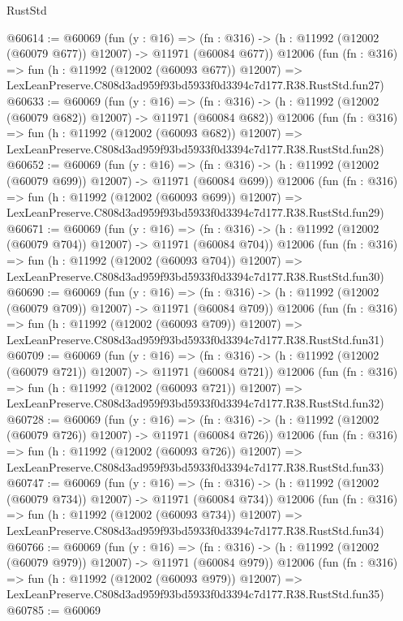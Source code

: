 \begin{lexlean}{RustStd}
\begin{coremodule}
@60614 := @60069
    (fun (y : @16) =>
    (fn : @316) -> (h : @11992 (@12002 (@60079 @677)) @12007) -> @11971 (@60084 @677))
    @12006
    (fun (fn : @316) =>
    fun (h : @11992 (@12002 (@60093 @677)) @12007) =>
    LexLeanPreserve.C808d3ad959f93bd5933f0d3394c7d177.R38.RustStd.fun27)
@60633 := @60069
    (fun (y : @16) =>
    (fn : @316) -> (h : @11992 (@12002 (@60079 @682)) @12007) -> @11971 (@60084 @682))
    @12006
    (fun (fn : @316) =>
    fun (h : @11992 (@12002 (@60093 @682)) @12007) =>
    LexLeanPreserve.C808d3ad959f93bd5933f0d3394c7d177.R38.RustStd.fun28)
@60652 := @60069
    (fun (y : @16) =>
    (fn : @316) -> (h : @11992 (@12002 (@60079 @699)) @12007) -> @11971 (@60084 @699))
    @12006
    (fun (fn : @316) =>
    fun (h : @11992 (@12002 (@60093 @699)) @12007) =>
    LexLeanPreserve.C808d3ad959f93bd5933f0d3394c7d177.R38.RustStd.fun29)
@60671 := @60069
    (fun (y : @16) =>
    (fn : @316) -> (h : @11992 (@12002 (@60079 @704)) @12007) -> @11971 (@60084 @704))
    @12006
    (fun (fn : @316) =>
    fun (h : @11992 (@12002 (@60093 @704)) @12007) =>
    LexLeanPreserve.C808d3ad959f93bd5933f0d3394c7d177.R38.RustStd.fun30)
@60690 := @60069
    (fun (y : @16) =>
    (fn : @316) -> (h : @11992 (@12002 (@60079 @709)) @12007) -> @11971 (@60084 @709))
    @12006
    (fun (fn : @316) =>
    fun (h : @11992 (@12002 (@60093 @709)) @12007) =>
    LexLeanPreserve.C808d3ad959f93bd5933f0d3394c7d177.R38.RustStd.fun31)
@60709 := @60069
    (fun (y : @16) =>
    (fn : @316) -> (h : @11992 (@12002 (@60079 @721)) @12007) -> @11971 (@60084 @721))
    @12006
    (fun (fn : @316) =>
    fun (h : @11992 (@12002 (@60093 @721)) @12007) =>
    LexLeanPreserve.C808d3ad959f93bd5933f0d3394c7d177.R38.RustStd.fun32)
@60728 := @60069
    (fun (y : @16) =>
    (fn : @316) -> (h : @11992 (@12002 (@60079 @726)) @12007) -> @11971 (@60084 @726))
    @12006
    (fun (fn : @316) =>
    fun (h : @11992 (@12002 (@60093 @726)) @12007) =>
    LexLeanPreserve.C808d3ad959f93bd5933f0d3394c7d177.R38.RustStd.fun33)
@60747 := @60069
    (fun (y : @16) =>
    (fn : @316) -> (h : @11992 (@12002 (@60079 @734)) @12007) -> @11971 (@60084 @734))
    @12006
    (fun (fn : @316) =>
    fun (h : @11992 (@12002 (@60093 @734)) @12007) =>
    LexLeanPreserve.C808d3ad959f93bd5933f0d3394c7d177.R38.RustStd.fun34)
@60766 := @60069
    (fun (y : @16) =>
    (fn : @316) -> (h : @11992 (@12002 (@60079 @979)) @12007) -> @11971 (@60084 @979))
    @12006
    (fun (fn : @316) =>
    fun (h : @11992 (@12002 (@60093 @979)) @12007) =>
    LexLeanPreserve.C808d3ad959f93bd5933f0d3394c7d177.R38.RustStd.fun35)
@60785 := @60069

\end{coremodule}
\end{lexlean}
